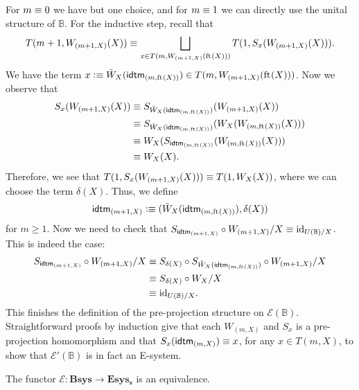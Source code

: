 \begin{constr}
For $m\equiv 0$ we have but one
choice, and for $m\equiv 1$ we can directly use the unital structure of
$\mathbb{B}$. For the inductive step, recall that
\begin{equation*}
T(m+1,W_{(m+1,X)}(X))\equiv\bigsqcup_{x\in T(m,W_{(m+1,X)}(\mathrm{ft}_{}(X)))}T(1,S_x(W_{(m+1,X)}(X))).
\end{equation*}
We have the term $x\defeq \tilde{W}_X(\tfid{(m,\eft(X))})\in T(m,W_{(m+1,X)}(\eft(X)))$.
Now we observe that 
\begin{align*}
S_x(W_{(m+1,X)}(X))
  & \jdeq 
S_{\tilde{W}_X(\tfid{(m,\eft(X))})}(W_{(m+1,X)}(X))\\
  & \jdeq 
S_{\tilde{W}_X(\tfid{(m,\eft(X))})}(W_X(W_{(m,\eft(X))}(X))) \\
  & \jdeq
W_{X}(S_{\tfid{(m,\eft(X))}}(W_{(m,\eft(X))}(X))) \\
  & \jdeq 
W_{X}(X).
\end{align*}
Therefore, we see that $T(1,S_x(W_{(m+1,X)}(X)))\equiv T(1,W_X(X))$, where we can
choose the term $\delta(X)$. Thus, we define
\begin{equation*}
\tfid{(m+1,X)}\defeq (\tilde{W}_X(\tfid{(m,\eft(X))}),\delta(X))
\end{equation*} 
for $m\geq 1$. Now we need to check that $S_{\tfid{(m+1,X)}}\circ 
W_{(m+1,X)}/X\jdeq \catid{U(\mathbb{B})/X}$. This is indeed the case:
\begin{align*}
S_{\tfid{(m+1,X)}}\circ W_{(m+1,X)}/X
  & \jdeq
S_{\delta(X)}\circ S_{\tilde{W}_X(\tfid{(m,\eft(X))})}\circ W_{(m+1,X)}/X \\
  & \jdeq
S_{\delta(X)}\circ W_X/X \\
  & \jdeq
\catid{U(\mathbb{B})/X}.
\end{align*}
This finishes the definition of the pre-projection structure on $\mathcal{E}(\mathbb{B})$.
Straightforward proofs by induction give that each $W_{(m,X)}$ and $S_x$ is a 
pre-projection homomorphism and that $S_x(\tfid{(m,X)})\jdeq x$, for any 
$x\in T(m,X)$, to show that $\mathcal{E}'(\mathbb{B})$ is in fact an E-system.
\end{constr}

\begin{thm}
The functor $\mathcal{E}:\mathbf{Bsys}\to\mathbf{Esys_s}$ is an equivalence.
\begin{comment}
to the subcategory $\mathbf{Esys}_s$ of stratified E-systems: i.e.~we have a
commuting diagram
\begin{equation*}
\begin{tikzcd}
& \mathbf{Esys}_s \arrow[dr,"\subseteq"]\\
\mathbf{Bsys} \arrow[ur,"\simeq"] \arrow[rr,swap,"\mathcal{E}"] & & \mathbf{Esys}
\end{tikzcd}
\end{equation*}
\end{comment}
\end{thm}

